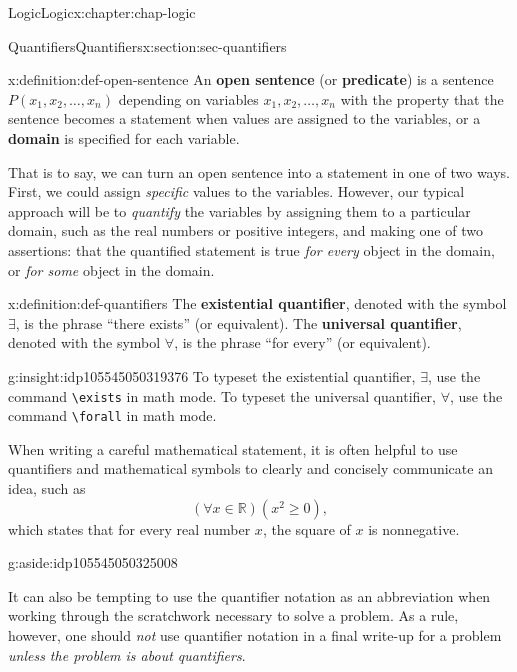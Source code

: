 \documentclass[oneside,10pt,]{book}
\newcommand{\mono}[1]{\texttt{#1}}
\newcommand{\terminology}[1]{\textbf{#1}}
\renewcommand{\ge}{\geqslant}
\def\R{{\mathbb R}}
\newcommand{\R}{\mathbb R}
\begin{document}
\begin{chapterptx}{Logic}{}{Logic}{}{}{x:chapter:chap-logic}
\begin{sectionptx}{Quantifiers}{}{Quantifiers}{}{}{x:section:sec-quantifiers}
\begin{definition}{}{x:definition:def-open-sentence}%
%
An \terminology{open sentence} (or \terminology{predicate}) is a sentence \(P(x_1, x_2, \ldots, x_n)\) depending on variables \(x_1, x_2, \ldots, x_n\) with the property that the sentence becomes a statement when values are assigned to the variables, or a \terminology{domain} is specified for each variable.%
\end{definition}
That is to say, we can turn an open sentence into a statement in one of two ways. First, we could assign \emph{specific} values to the variables. However, our typical approach will be to \emph{quantify} the variables by assigning them to a particular domain, such as the real numbers or positive integers, and making one of two assertions: that the quantified statement is true \emph{for every} object in the domain, or \emph{for some} object in the domain.%
\begin{definition}{}{x:definition:def-quantifiers}%
%
%
The \terminology{existential quantifier}, denoted with the symbol \(\exists\), is the phrase ``there exists'' (or equivalent). The \terminology{universal quantifier}, denoted with the symbol \(\forall\), is the phrase ``for every'' (or equivalent).%
\end{definition}
\begin{insight}{}{g:insight:idp105545050319376}%
%
%
To typeset the existential quantifier, \(\exists\), use the command \mono{\textbackslash{}exists} in math mode. To typeset the universal quantifier, \(\forall\), use the command \mono{\textbackslash{}forall} in math mode.%
\end{insight}
When writing a careful mathematical statement, it is often helpful to use quantifiers and mathematical symbols to clearly and concisely communicate an idea, such as%
%
\begin{equation*}
(\forall x \in \R) (x^2 \ge 0),
\end{equation*}
which states that for every real number \(x\), the square of \(x\) is nonnegative.\begin{aside}{}{g:aside:idp105545050325008}%
\end{aside}
 It can also be tempting to use the quantifier notation as an abbreviation when working through the scratchwork necessary to solve a problem. As a rule, however, one should \emph{not} use quantifier notation in a final write-up for a problem \emph{unless the problem is about quantifiers}.%

\end{sectionptx}
\end{chapterptx}
\end{document}
